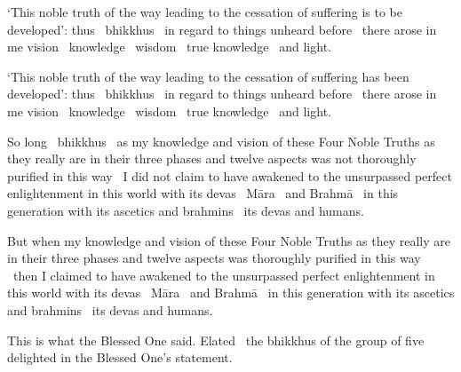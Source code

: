 \medskip

\begin{english-hang}
  `This noble truth of the way leading to the cessation of suffering is to be developed': thus \breathmark\ bhikkhus \breathmark\ in regard to things unheard before \breathmark\ there arose in me vision \breathmark\ knowledge \breathmark\ wisdom \breathmark\ true knowledge \breathmark\ and light.
\end{english-hang}

\medskip

\begin{english-hang}
  `This noble truth of the way leading to the cessation of suffering has been developed': thus \breathmark\ bhikkhus \breathmark\ in regard to things unheard before \breathmark\ there arose in me vision \breathmark\ knowledge \breathmark\ wisdom \breathmark\ true knowledge \breathmark\ and light.
\end{english-hang}

\medskip

\begin{english-hang}
  So long \breathmark\ bhikkhus \breathmark\ as my knowledge and vision of these Four Noble Truths as they really are in their three phases and twelve aspects was not thoroughly purified in this way \breathmark\ I did not claim to have awakened to the unsurpassed perfect enlightenment in this world with its devas \breathmark\ Māra \breathmark\ and Brahmā \breathmark\ in this generation with its ascetics and brahmins \breathmark\ its devas and humans.
\end{english-hang}

\medskip

\begin{english-hang}
  But when my knowledge and vision of these Four Noble Truths as they really are in their three phases and twelve aspects was thoroughly purified in this way \breathmark\ then I claimed to have awakened to the unsurpassed perfect enlightenment in this world with its devas \breathmark\ Māra \breathmark\ and Brahmā \breathmark\ in this generation with its ascetics and brahmins \breathmark\ its devas and humans.
\end{english-hang}

\medskip

\begin{english-hang}
  This is what the Blessed One said. Elated \breathmark\ the bhikkhus of the group of five delighted in the Blessed One's statement.
\end{english-hang}

